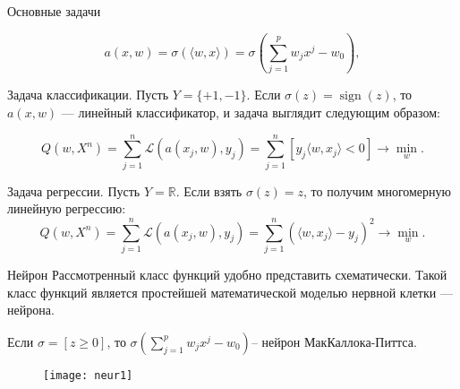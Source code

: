\documentclass[11pt]{beamer}
\DeclareMathOperator{\sign}{sign}
\begin{document}
	\begin{frame}{Основные задачи}
		
		\begin{equation*}
			a(x, w) = \sigma( \langle w,x \rangle ) = \sigma\left(\sum_{j=1}^{p} w_j x^j - w_0 \right),
		\end{equation*}
	
		Задача классификации. Пусть $Y=\{+1,-1\}$. Если $\sigma (z)=\sign(z)$, то $a(x,w)$ --- линейный классификатор, и задача выглядит следующим образом: 
		
		\begin{equation*}
			Q(w, X^{n})=\sum_{j=1}^{n} \mathcal{L} \left( a(x_j ,w), y_j \right) = \sum_{j=1}^{n} [y_j \langle w,x_j \rangle  < 0] \rightarrow \min_{w}.
		\end{equation*}
		
		Задача регрессии. Пусть $Y=\mathbb{R}$. Если взять $\sigma(z)=z$, то получим многомерную линейную регрессию:
		\begin{equation*}
			Q(w, X^{n})=\sum_{j=1}^{n} \mathcal{L} \left( a( x_j,w ), y_j \right)=\sum_{j=1}^{n}\left( \langle w,x_j \rangle  -y_j \right)^2 \rightarrow \min_{w}.
		\end{equation*}
	\end{frame}

	\begin{frame}{Нейрон}
		Рассмотренный класс функций удобно представить схематически. Такой класс функций является простейшей математической моделью нервной клетки --- нейрона.
		
		Если $\sigma = [z\geq0]$, то $\sigma\left(\sum_{j=1}^{p} w_j x^j - w_0 \right)$-- нейрон МакКаллока-Питтса. 
		
	\begin{figure}[hhh!]
		\begin{center}
			\texttt{[image: neur1]}
		\end{center}
		\vspace{-5mm}
	\end{figure}

	\end{frame}
\end{document}
